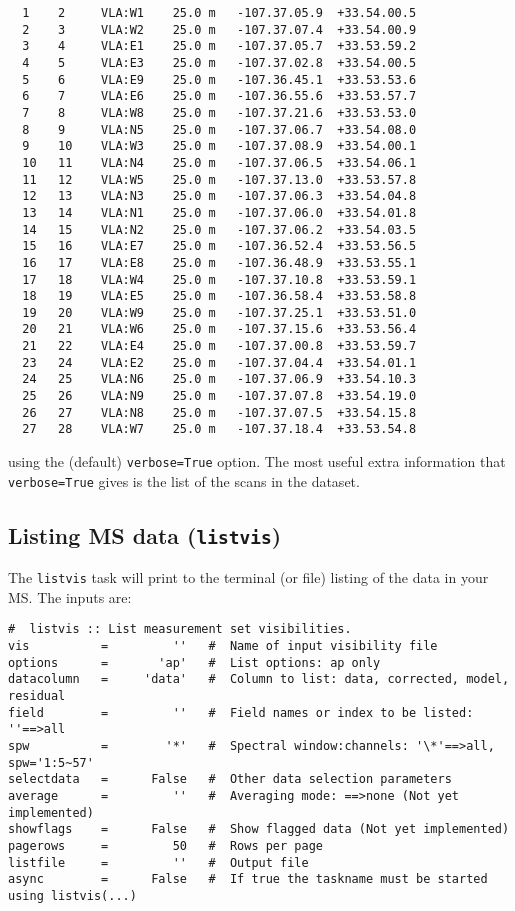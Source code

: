 \begin{verbatim}
  1    2     VLA:W1    25.0 m   -107.37.05.9  +33.54.00.5  
  2    3     VLA:W2    25.0 m   -107.37.07.4  +33.54.00.9  
  3    4     VLA:E1    25.0 m   -107.37.05.7  +33.53.59.2  
  4    5     VLA:E3    25.0 m   -107.37.02.8  +33.54.00.5  
  5    6     VLA:E9    25.0 m   -107.36.45.1  +33.53.53.6  
  6    7     VLA:E6    25.0 m   -107.36.55.6  +33.53.57.7  
  7    8     VLA:W8    25.0 m   -107.37.21.6  +33.53.53.0  
  8    9     VLA:N5    25.0 m   -107.37.06.7  +33.54.08.0  
  9    10    VLA:W3    25.0 m   -107.37.08.9  +33.54.00.1  
  10   11    VLA:N4    25.0 m   -107.37.06.5  +33.54.06.1  
  11   12    VLA:W5    25.0 m   -107.37.13.0  +33.53.57.8  
  12   13    VLA:N3    25.0 m   -107.37.06.3  +33.54.04.8  
  13   14    VLA:N1    25.0 m   -107.37.06.0  +33.54.01.8  
  14   15    VLA:N2    25.0 m   -107.37.06.2  +33.54.03.5  
  15   16    VLA:E7    25.0 m   -107.36.52.4  +33.53.56.5  
  16   17    VLA:E8    25.0 m   -107.36.48.9  +33.53.55.1  
  17   18    VLA:W4    25.0 m   -107.37.10.8  +33.53.59.1  
  18   19    VLA:E5    25.0 m   -107.36.58.4  +33.53.58.8  
  19   20    VLA:W9    25.0 m   -107.37.25.1  +33.53.51.0  
  20   21    VLA:W6    25.0 m   -107.37.15.6  +33.53.56.4  
  21   22    VLA:E4    25.0 m   -107.37.00.8  +33.53.59.7  
  23   24    VLA:E2    25.0 m   -107.37.04.4  +33.54.01.1  
  24   25    VLA:N6    25.0 m   -107.37.06.9  +33.54.10.3  
  25   26    VLA:N9    25.0 m   -107.37.07.8  +33.54.19.0  
  26   27    VLA:N8    25.0 m   -107.37.07.5  +33.54.15.8  
  27   28    VLA:W7    25.0 m   -107.37.18.4  +33.53.54.8  
\end{verbatim}
\normalsize
using the (default) {\tt verbose=True} option.
The most useful extra information that {\tt verbose=True} gives
is the list of the scans in the dataset.

\subsection{Listing MS data ({\tt listvis})}
\label{section:io.vis.listvis}

The {\tt listvis} task will print to the terminal (or file) listing
of the data in your MS.
The inputs are:
\small
\begin{verbatim}
#  listvis :: List measurement set visibilities.
vis          =         ''   #  Name of input visibility file
options      =       'ap'   #  List options: ap only
datacolumn   =     'data'   #  Column to list: data, corrected, model, residual
field        =         ''   #  Field names or index to be listed: ''==>all
spw          =        '*'   #  Spectral window:channels: '\*'==>all, spw='1:5~57'
selectdata   =      False   #  Other data selection parameters
average      =         ''   #  Averaging mode: ==>none (Not yet implemented)
showflags    =      False   #  Show flagged data (Not yet implemented)
pagerows     =         50   #  Rows per page
listfile     =         ''   #  Output file
async        =      False   #  If true the taskname must be started using listvis(...)
\end{verbatim}
\normalsize

